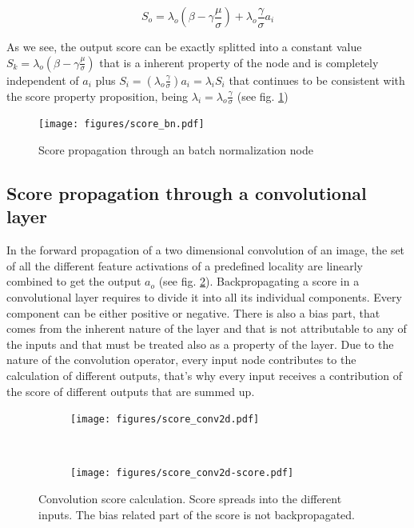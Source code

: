 \documentclass[preprint]{elsarticle}
\theoremstyle{definition} %
\theoremstyle{remark}
\begin{document}
\begin{equation}
	S_o = \lambda_o (\beta - \gamma \frac{\mu}{\sigma}) + \lambda_o \frac{\gamma}{\sigma}a_i
\end{equation}

As we see, the output score can be exactly splitted into a constant value $S_k = \lambda_o (\beta - \gamma \frac{\mu}{\sigma})$ that is a inherent property of the node and is completely independent of $a_i$ plus $S_i = (\lambda_o \frac{\gamma}{\sigma})a_i = \lambda_i S_i$ that continues to be consistent with the score property proposition, being $\lambda_i = \lambda_o \frac{\gamma}{\sigma}$ (see fig. \ref{fig:score_bn})

\begin{figure}[h!]
	\centering
	\texttt{[image: figures/score\_bn.pdf]}
	\caption{Score propagation through an batch normalization node}
	\label{fig:score_bn}
\end{figure}

\subsection{Score propagation through a convolutional layer}

In the forward propagation of a two dimensional convolution of an image, the set of all the different feature activations of a predefined locality are linearly combined to get the output $a_o$ (see fig. \ref{fig:convolution_score}). Backpropagating a score in a convolutional layer requires to divide it into all its individual components. Every component can be either positive or negative. There is also a bias part, that comes from the inherent nature of the layer and that is not attributable to any of the inputs and that must be treated also as a property of the layer. Due to the nature of the convolution operator, every input node contributes to the calculation of different outputs, that's why every input receives a contribution of the score of different outputs that are summed up.

\begin{figure}[h!]
	\centering
	\begin{subfigure}{0.4\textwidth}
		\texttt{[image: figures/score\_conv2d.pdf]}
	\end{subfigure}
	~ %
	\begin{subfigure}{0.4\textwidth}
		\texttt{[image: figures/score\_conv2d-score.pdf]}
	\end{subfigure}
	\caption{Convolution score calculation. Score spreads into the different inputs. The bias related part of the score is not backpropagated.}
	\label{fig:convolution_score}
\end{figure}
\end{document}
